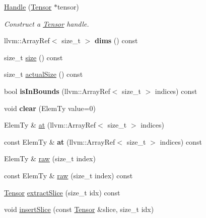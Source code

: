 \begin{DoxyCompactItemize}
\item 
\hyperlink{classglow_1_1_handle_a9c2df11f63a6d74d56f9630ab0d5b213}{Handle} (\hyperlink{classglow_1_1_tensor}{Tensor} $\ast$tensor)
\begin{DoxyCompactList}\small\item\em Construct a \hyperlink{classglow_1_1_tensor}{Tensor} handle. \end{DoxyCompactList}\item 
\mbox{\label{classglow_1_1_handle_ade42ad6f343eca2623f33e0db0845426}} 
llvm\+::\+Array\+Ref$<$ size\+\_\+t $>$ {\bfseries dims} () const
\item 
size\+\_\+t \hyperlink{classglow_1_1_handle_a7322ebb8b8d2d57f4ea9ec93f238b7a5}{size} () const
\item 
size\+\_\+t \hyperlink{classglow_1_1_handle_a1e2e96d19c373742cc3e667720958097}{actual\+Size} () const
\item 
\mbox{\label{classglow_1_1_handle_ac6e32121664e86e9ef7ca79967494cc8}} 
bool {\bfseries is\+In\+Bounds} (llvm\+::\+Array\+Ref$<$ size\+\_\+t $>$ indices) const
\item 
\mbox{\label{classglow_1_1_handle_a9dc0c4a5e81c496abca71df14e08b605}} 
void {\bfseries clear} (Elem\+Ty value=0)
\item 
Elem\+Ty \& \hyperlink{classglow_1_1_handle_a4170feefa1d97ce95bbdf7c880811c2b}{at} (llvm\+::\+Array\+Ref$<$ size\+\_\+t $>$ indices)
\item 
\mbox{\label{classglow_1_1_handle_aff86c3f4eec15f312089c498a9426486}} 
const Elem\+Ty \& {\bfseries at} (llvm\+::\+Array\+Ref$<$ size\+\_\+t $>$ indices) const
\item 
Elem\+Ty \& \hyperlink{classglow_1_1_handle_aea03569f22a6d701b671403b5d4c2d43}{raw} (size\+\_\+t index)
\item 
const Elem\+Ty \& \hyperlink{classglow_1_1_handle_ae9004553e87770e18aa2396d88bfeeff}{raw} (size\+\_\+t index) const
\item 
\hyperlink{classglow_1_1_tensor}{Tensor} \hyperlink{classglow_1_1_handle_a602cde4751f83f7a3b11a3b099ade080}{extract\+Slice} (size\+\_\+t idx) const
\item 
void \hyperlink{classglow_1_1_handle_a4f14f140791e25024d601c91ca2f8ced}{insert\+Slice} (const \hyperlink{classglow_1_1_tensor}{Tensor} \&slice, size\+\_\+t idx)

\end{DoxyCompactItemize}
